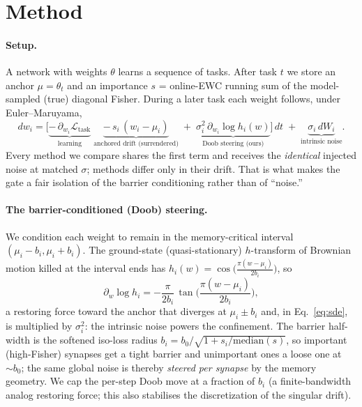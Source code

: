 \documentclass[11pt]{article}
\begin{document}
\section{Method}\label{sec:method}

\paragraph{Setup.}
A network with weights $\theta$ learns a sequence of tasks. After task $t$ we store
an anchor $\mu=\theta_t$ and an importance $s$ = online-EWC running sum of the
model-sampled (true) diagonal Fisher. During a later task each weight follows, under
Euler--Maruyama,
\begin{equation}
dw_i = \big[\underbrace{-\,\partial_{w_i}\mathcal{L}_{\text{task}}}_{\text{learning}}
\;\underbrace{-\,s_i\,(w_i-\mu_i)}_{\text{anchored drift (surrendered)}}
\;+\;\underbrace{\sigma_i^2\,\partial_{w_i}\log h_i(w)}_{\text{Doob steering (ours)}}\big]\,dt
\;+\;\underbrace{\sigma_i\,dW_i}_{\text{intrinsic noise}} .
\label{eq:sde}
\end{equation}
Every method we compare shares the first term and receives the \emph{identical}
injected noise at matched $\sigma$; methods differ only in their drift. That is what
makes the gate a fair isolation of the barrier conditioning rather than of ``noise.''

\paragraph{The barrier-conditioned (Doob) steering.}
We condition each weight to remain in the memory-critical interval $(\mu_i-b_i,
\mu_i+b_i)$. The ground-state (quasi-stationary) $h$-transform of Brownian motion
killed at the interval ends has $h_i(w)=\cos\!\big(\tfrac{\pi (w-\mu_i)}{2b_i}\big)$,
so
\begin{equation}
\partial_{w}\log h_i = -\frac{\pi}{2b_i}\,
\tan\!\Big(\frac{\pi (w-\mu_i)}{2b_i}\Big),
\end{equation}
a restoring force toward the anchor that diverges at $\mu_i\pm b_i$ and, in
Eq.~\eqref{eq:sde}, is multiplied by $\sigma_i^2$: the intrinsic noise powers the
confinement. The barrier half-width is the softened iso-loss radius
$b_i=b_0/\sqrt{1+s_i/\mathrm{median}(s)}$, so important (high-Fisher) synapses get a
tight barrier and unimportant ones a loose one at $\sim b_0$; the same global noise
is thereby \emph{steered per synapse} by the memory geometry. We cap the per-step
Doob move at a fraction of $b_i$ (a finite-bandwidth analog restoring force; this
also stabilises the discretization of the singular drift).
\end{document}
